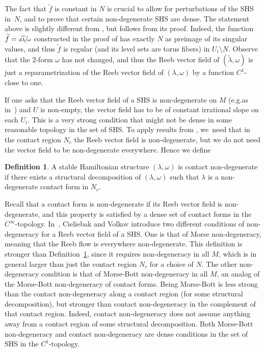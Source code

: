 \documentclass[10pt]{amsart}
\theoremstyle{definition}
\newtheorem{defi}[theorem]{Definition}
\providecommand{\eg}{e.g.}\providecommand{\ie}{i.e.}\providecommand{\etc}{etc.}\providecommand{\resp}{resp.}\providecommand{\cf}{cf.}
\begin{document}
The fact that $\widetilde f$ is constant in $N$ is crucial to allow for perturbations of the SHS in~$N$, and to prove that certain non-degenerate SHS are dense. The statement above is slightly different from \cite[Th.\,4.1]{CV1}, but follows from its proof. Indeed, the function $\widetilde f=\sfrac{d\widetilde \lambda}{\omega}$ constructed in the proof of \cite[Th.\,4.1]{CV1} has exactly $N$ as preimage of its singular values, and thus $\tilde f$ is regular (and its level sets are torus fibers) in $U_i\setminus N$. Observe that the 2-form $\omega$ has not changed, and thus the Reeb vector field of $(\widetilde \lambda,\omega)$ is just a reparametrization of the Reeb vector field of $(\lambda,\omega)$ by a function $C^1$-close to one.

If one asks that the Reeb vector field of a SHS is non-degenerate on $M$ (\eg as in~\cite{MS}) and $U$ is non-empty, the vector field has to be of constant irrational slope on each $U_i$. This is a very strong condition that might not be dense in some reasonable topology in the set of SHS. To apply results from \cite{CDR}, we~need that in the contact region $N_c$ the Reeb vector field is non-degenerate, but we do not need the vector field to be non-degenerate everywhere. Hence we define

\begin{defi}\label{def:contactND}
A stable Hamiltonian structure $(\lambda,\omega)$ is contact non-degenerate if there exists a structural decomposition of $(\lambda,\omega)$ such that $\lambda$ is a non-degenerate contact form in $N_c$.
\end{defi}

Recall that a contact form is non-degenerate if its Reeb vector field is non-degenerate, and this property is satisfied by a dense set of contact forms in the $C^\infty$-topology. In~\cite[p.\,375]{CV1}, Cieliebak and Volkov introduce two different conditions of non-degeneracy for a Reeb vector field of a SHS. One is that of Morse non-degeneracy, meaning that the Reeb flow is everywhere non-degenerate. This definition is stronger than Definition~\ref{def:contactND}, since it requires non-degeneracy in all $M$, which is in general larger than just the contact region $N_c$ for a choice of $N$. The other non-degeneracy condition is that of Morse-Bott non-degeneracy in all $M$, an analog of the Morse-Bott non-degeneracy of contact forms. Being Morse-Bott is less strong than the contact non-degeneracy along a contact region (for some structural decomposition), but stronger than contact non-degeneracy in the complement of that contact region. Indeed, contact non-degeneracy does not assume anything away from a contact region of some structural decomposition. Both Morse-Bott non-degeneracy and contact non-degeneracy are dense conditions in the set of SHS in the $C^1$-topology.
\end{document}

